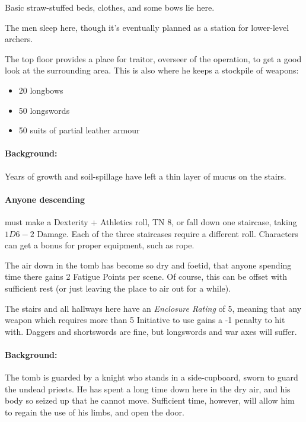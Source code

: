 \begin{multicols}{2}
Basic straw-stuffed beds, clothes, and some bows lie here.


The men sleep here, though it's eventually planned as a station for lower-level archers.


The top floor provides a place for \gls{traitor}, overseer of the operation, to get a good look at the surrounding area.
This is also where he keeps a stockpile of weapons:

\begin{itemize}

  \item{20 longbows}
  \item{50 longswords}
  \item{50 suits of partial leather armour}

\end{itemize}

\label{underGreenTower}

\paragraph{Background:}
Years of growth and soil-spillage have left a thin layer of mucus on the stairs.

\paragraph{Anyone descending}
must make a Dexterity + Athletics roll, TN 8, or fall down one staircase, taking $1D6-2$ Damage.
Each of the three staircases require a different roll.
Characters can get a bonus for proper equipment, such as rope.

The air down in the tomb has become so dry and foetid, that anyone spending time there gains 2 Fatigue Points per scene.
Of course, this can be offset with sufficient rest (or just leaving the place to air out for a while).

The stairs and all hallways here have an \textit{Enclosure Rating} of 5, meaning that any weapon which requires more than 5 Initiative to use gains a -1 penalty to hit with.
Daggers and shortswords are fine, but longswords and war axes will suffer.


\paragraph{Background:}
The tomb is guarded by a knight who stands in a side-cupboard, sworn to guard the undead priests.
He has spent a long time down here in the dry air, and his body so seized up that he cannot move.
Sufficient time, however, will allow him to regain the use of his limbs, and open the door.


\end{multicols}
